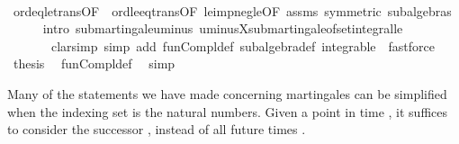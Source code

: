 \begin{isabellebody}
\ \ \ \ \isamarkupfalse%
\ ord{\isacharunderscore}{\kern0pt}eq{\isacharunderscore}{\kern0pt}le{\isacharunderscore}{\kern0pt}trans{\isacharbrackleft}{\kern0pt}OF\ {\isacharasterisk}{\kern0pt}\ ord{\isacharunderscore}{\kern0pt}le{\isacharunderscore}{\kern0pt}eq{\isacharunderscore}{\kern0pt}trans{\isacharbrackleft}{\kern0pt}OF\ le{\isacharunderscore}{\kern0pt}imp{\isacharunderscore}{\kern0pt}neg{\isacharunderscore}{\kern0pt}le{\isacharbrackleft}{\kern0pt}OF\ assms{\isacharparenleft}{\kern0pt}{}{\isacharparenright}{\kern0pt}{\isacharbrackright}{\kern0pt}\ {\isacharasterisk}{\kern0pt}{\isacharbrackleft}{\kern0pt}symmetric{\isacharbrackright}{\kern0pt}{\isacharbrackright}{\kern0pt}{\isacharbrackright}{\kern0pt}\ subalgebras\isanewline
\ \ \ \ \isamarkupfalse%
\ {\isacharparenleft}{\kern0pt}intro\ submartingale{\isachardot}{\kern0pt}uminus\ uminus{\isacharunderscore}{\kern0pt}X{\isachardot}{\kern0pt}submartingale{\isacharunderscore}{\kern0pt}of{\isacharunderscore}{\kern0pt}set{\isacharunderscore}{\kern0pt}integral{\isacharunderscore}{\kern0pt}le{\isacharparenright}{\kern0pt}\ \isanewline
\ \ \ \ \ \ \ {\isacharparenleft}{\kern0pt}clarsimp\ simp\ add{\isacharcolon}{\kern0pt}\ fun{\isacharunderscore}{\kern0pt}Compl{\isacharunderscore}{\kern0pt}def\ subalgebra{\isacharunderscore}{\kern0pt}def\ integrable\ {\isacharbar}{\kern0pt}\ fastforce{\isacharparenright}{\kern0pt}{\isacharplus}{\kern0pt}\isanewline
\ \ \isamarkupfalse%
\ {\isacharquery}{\kern0pt}thesis\ \isamarkupfalse%
\ fun{\isacharunderscore}{\kern0pt}Compl{\isacharunderscore}{\kern0pt}def\ \isamarkupfalse%
\ simp\isanewline
{}\isamarkupfalse%
%
\endisatagproof
{\isafoldproof}%
%
\isadelimproof
%
\endisadelimproof
%
\begin{isamarkuptext}%
Many of the statements we have made concerning martingales can be simplified when the indexing set is the natural numbers. 
      Given a point in time , it suffices to consider the successor , instead of all future times .%
\end{isamarkuptext}\isamarkuptrue%
%
\isadelimdocument
%
\endisadelimdocument
%
\isatagdocument
%
\isamarkuptrue%
%
\endisatagdocument
{\isafolddocument}%
%
\isadelimdocument

\end{isabellebody}
